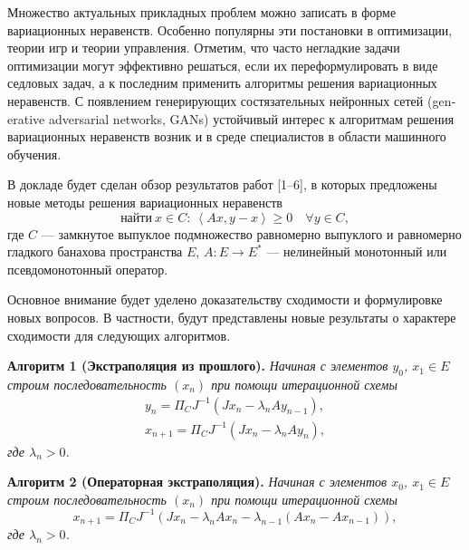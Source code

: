 
\vzmscaption

Множество актуальных  прикладных проблем можно записать в форме вариационных неравенств. Особенно популярны эти постановки в оптимизации, теории игр и теории управления. Отметим, что часто негладкие задачи оптимизации могут эффективно решаться, если
их переформулировать в виде седловых задач, а к последним применить алгоритмы решения вариационных неравенств. С появлением
генерирующих состязательных нейронных сетей
\foreignlanguage{english}{(generative adversarial networks, GANs)}
устойчивый интерес к алгоритмам решения вариационных неравенств возник и в среде специалистов в области машинного обучения.

В докладе будет сделан обзор результатов работ [1--6], в которых предложены новые методы решения вариационных неравенств
$$
\mbox{найти} \  x \in C :  \ \left\langle Ax, y-x \right\rangle \geq 0\quad \forall y \in C,
$$
где $C$ --- замкнутое выпуклое подмножество равномерно выпуклого и равномерно гладкого банахова пространства $E$, $A: E \to E^\ast$ --- нелинейный монотонный или псевдомонотонный оператор.

Основное внимание будет уделено доказательству сходимости и
формулировке новых вопросов. В частности, будут представлены новые результаты о характере сходимости для следующих алгоритмов.

	\textbf{Алгоритм 1 (Экстраполяция из прошлого).} {\it Начиная с элементов $y_0$, $x_1 \in E$ строим последовательность $(x_n)$ при помощи итерационной схемы
$$
\begin{array}{l}
y_{n}  = \Pi _{C} J^{-1} \left( Jx_{n} -\lambda_n Ay_{n-1} \right), \\
x_{n+1} = \Pi _{C} J^{-1} \left( Jx_{n} -\lambda_n Ay_{n} \right),
\end{array}
$$
где $\lambda_n >0$.}


\textbf{Алгоритм 2 (Операторная экстраполяция).} {\it Начиная с элементов $x_0$, $x_1 \in E$ строим последовательность $(x_n)$ при помощи итерационной схемы
$$
x_{n+1} =\Pi _{C} J^{-1} \left(Jx_{n} -\lambda _{n} Ax_{n} -\lambda _{n-1} \left(Ax_{n} -Ax_{n-1} \right)\right) ,
$$
где $\lambda_n >0$.}


